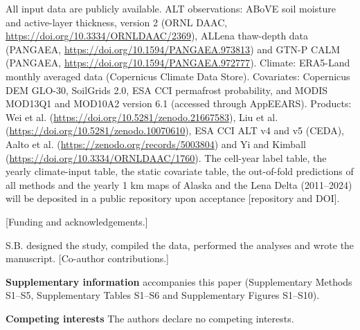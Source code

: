 \ifnum{}
All input data are publicly available. ALT observations: ABoVE soil moisture and active-layer thickness, version 2 (ORNL DAAC, \url{https://doi.org/10.3334/ORNLDAAC/2369}), ALLena thaw-depth data (PANGAEA, \url{https://doi.org/10.1594/PANGAEA.973813}) and GTN-P CALM (PANGAEA, \url{https://doi.org/10.1594/PANGAEA.972777}). Climate: ERA5-Land monthly averaged data (Copernicus Climate Data Store). Covariates: Copernicus DEM GLO-30, SoilGrids 2.0, ESA CCI permafrost probability, and MODIS MOD13Q1 and MOD10A2 version 6.1 (accessed through AppEEARS). Products: Wei et al. (\url{https://doi.org/10.5281/zenodo.21667583}), Liu et al. (\url{https://doi.org/10.5281/zenodo.10070610}), ESA CCI ALT v4 and v5 (CEDA), Aalto et al. (\url{https://zenodo.org/records/5003804}) and Yi and Kimball (\url{https://doi.org/10.3334/ORNLDAAC/1760}). The cell-year label table, the yearly climate-input table, the static covariate table, the out-of-fold predictions of all methods and the yearly 1 km maps of Alaska and the Lena Delta (2011--2024) will be deposited in a public repository upon acceptance [repository and DOI].
\fi

\ifnum{}
[Funding and acknowledgements.]

S.B. designed the study, compiled the data, performed the analyses and wrote the manuscript. [Co-author contributions.]

\textbf{Supplementary information} accompanies this paper (Supplementary Methods S1--S5, Supplementary Tables S1--S6 and Supplementary Figures S1--S10).

\textbf{Competing interests} The authors declare no competing interests.
\fi
